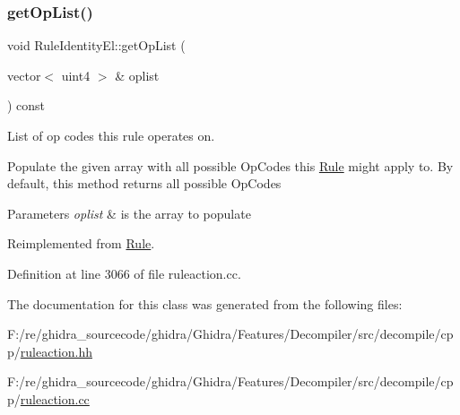 \subsubsection{\texorpdfstring{getOpList()}{getOpList()}}
{\footnotesize\ttfamily void Rule\+Identity\+El\+::get\+Op\+List (\begin{DoxyParamCaption}\item[{vector$<$ uint4 $>$ \&}]{oplist }\end{DoxyParamCaption}) const\hspace{0.3cm}{\ttfamily [virtual]}}



List of op codes this rule operates on. 

Populate the given array with all possible Op\+Codes this \mbox{\hyperlink{class_rule}{Rule}} might apply to. By default, this method returns all possible Op\+Codes 
\begin{DoxyParams}{Parameters}
{\em oplist} & is the array to populate \\
\hline
\end{DoxyParams}


Reimplemented from \mbox{\hyperlink{class_rule_a4023bfc7825de0ab866790551856d10e}{Rule}}.



Definition at line 3066 of file ruleaction.\+cc.



The documentation for this class was generated from the following files\+:\begin{DoxyCompactItemize}
\item 
F\+:/re/ghidra\+\_\+sourcecode/ghidra/\+Ghidra/\+Features/\+Decompiler/src/decompile/cpp/\mbox{\hyperlink{ruleaction_8hh}{ruleaction.\+hh}}\item 
F\+:/re/ghidra\+\_\+sourcecode/ghidra/\+Ghidra/\+Features/\+Decompiler/src/decompile/cpp/\mbox{\hyperlink{ruleaction_8cc}{ruleaction.\+cc}}\end{DoxyCompactItemize}
